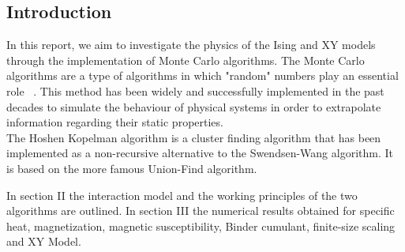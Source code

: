 \documentclass[twoside]{article}
\begin{document}
\begin{multicols}{2} %

\section{Introduction}
In this report, we aim to investigate the physics of the Ising and XY models through the implementation of Monte Carlo algorithms.
The Monte Carlo algorithms are a type of algorithms in which "random" numbers play an essential role ~\cite{thijssen}. This method has been widely and successfully implemented in the past decades to simulate the behaviour of physical systems in order to extrapolate information regarding their static properties. \\
The Hoshen Kopelman algorithm is a cluster finding algorithm that has been implemented as a non-recursive alternative to the Swendsen-Wang algorithm. It is based on the more famous Union-Find algorithm.

In section II the interaction model and the working principles of the two algorithms are outlined. In section III the numerical results obtained for specific heat, magnetization, magnetic susceptibility, Binder cumulant, finite-size scaling and XY Model.


\end{multicols}
\end{document}
